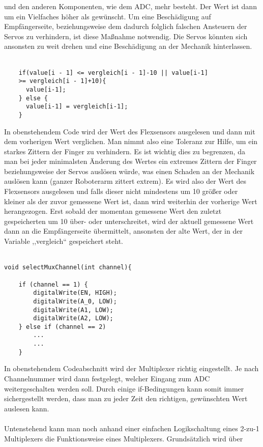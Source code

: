 \documentclass[titlepage,12pt,twoside]{article}
\begin{document}
und den anderen Komponenten, wie dem ADC, mehr besteht. Der Wert ist dann um ein 
Vielfaches höher als gewünscht. Um eine Beschädigung auf Empfängerseite, beziehungsweise 
dem dadurch folglich falschen Ansteuern der Servos zu verhindern, ist diese Maßnahme 
notwendig. Die Servos könnten sich ansonsten zu weit drehen und eine Beschädigung an 
der Mechanik hinterlassen. \\
\\
\begin{lstlisting}
    if(value[i - 1] <= vergleich[i - 1]-10 || value[i-1]
	>= vergleich[i - 1]+10){
      value[i-1];
    } else {
      value[i-1] = vergleich[i-1];
    }
\end{lstlisting}
\hfill \break
In obenstehendem Code wird der Wert des Flexsensors ausgelesen und dann mit dem 
vorherigen Wert verglichen. Man nimmt also eine Toleranz zur Hilfe, um ein starkes 
Zittern der Finger zu verhindern. Es ist wichtig dies zu begrenzen, da man bei jeder 
minimalsten Änderung des Wertes ein extremes Zittern der Finger beziehungsweise der 
Servos auslösen würde, was einen Schaden an der Mechanik auslösen kann (ganzer 
Roboterarm zittert extrem). Es wird also der Wert des Flexsensors ausgelesen und falls 
dieser nicht mindestens um 10 größer oder kleiner als der zuvor gemessene Wert ist, dann 
wird weiterhin der vorherige Wert herangezogen. Erst sobald der momentan gemessene Wert 
den zuletzt gespeicherten um 10 über- oder unterschreitet, wird der aktuell gemessene 
Wert dann an die Empfängerseite übermittelt, ansonsten der alte Wert, der in der 
Variable ,,vergleich“ gespeichert steht. \\
\\
\begin{lstlisting}
void selectMuxChannel(int channel){

	if (channel == 1) {
		digitalWrite(EN, HIGH);
		digitalWrite(A_0, LOW);
		digitalWrite(A1, LOW);
		digitalWrite(A2, LOW);
	} else if (channel == 2) 
		...
		...
	}
\end{lstlisting}
\hfill \break
In obenstehendem Codeabschnitt wird der Multiplexer richtig eingestellt. Je nach 
Channelnummer wird dann festgelegt, welcher Eingang zum ADC weitergeschalten werden 
soll. Durch einige if-Bedingungen kann somit immer sichergestellt werden, dass man 
zu jeder Zeit den richtigen, gewünschten Wert auslesen kann. \\
\\
Untenstehend kann man noch anhand einer einfachen Logikschaltung eines 2-zu-1 
Multiplexers die Funktionsweise eines Multiplexers. Grundsätzlich wird über 
\end{document}
